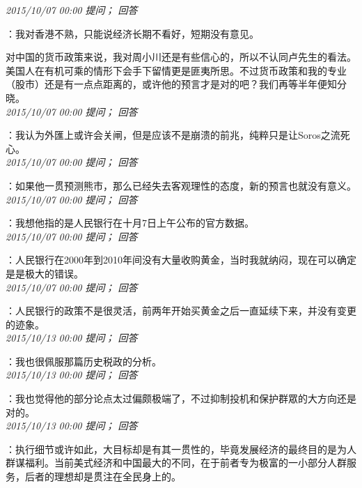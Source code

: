 \documentclass[twocolumn]{ctexart}
\begin{document}
\textit{\hfill\noindent\small 2015/10/07 00:00 提问； 回答}

：我对香港不熟，只能说经济长期不看好，短期没有意见。

对中国的货币政策来说，我对周小川还是有些信心的，所以不认同卢先生的看法。美国人在有机可乘的情形下会手下留情更是匪夷所思。不过货币政策和我的专业（股市）还是有一点点距离的，或许他的预言才是对的吧？我们再等半年便知分晓。\\

\textit{\hfill\noindent\small 2015/10/07 00:00 提问； 回答}

：我认为外匯上或许会关闸，但是应该不是崩溃的前兆，纯粹只是让Soros之流死心。\\

\textit{\hfill\noindent\small 2015/10/07 00:00 提问； 回答}

：如果他一贯预测熊市，那么已经失去客观理性的态度，新的预言也就没有意义。\\

\textit{\hfill\noindent\small 2015/10/07 00:00 提问； 回答}

：我想他指的是人民银行在十月7日上午公布的官方数据。\\

\textit{\hfill\noindent\small 2015/10/07 00:00 提问； 回答}

：人民银行在2000年到2010年间没有大量收购黄金，当时我就纳闷，现在可以确定是是极大的错误。\\

\textit{\hfill\noindent\small 2015/10/07 00:00 提问； 回答}

：人民银行的政策不是很灵活，前两年开始买黄金之后一直延续下来，并没有变更的迹象。\\

\textit{\hfill\noindent\small 2015/10/13 00:00 提问； 回答}

：我也很佩服那篇历史税政的分析。\\

\textit{\hfill\noindent\small 2015/10/13 00:00 提问； 回答}

：我也觉得他的部分论点太过偏颇极端了，不过抑制投机和保护群眾的大方向还是对的。\\

\textit{\hfill\noindent\small 2015/10/13 00:00 提问； 回答}

：执行细节或许如此，大目标却是有其一贯性的，毕竟发展经济的最终目的是为人群谋福利。当前美式经济和中国最大的不同，在于前者专为极富的一小部分人群服务，后者的理想却是贯注在全​​民身上的。\\
\end{document}
